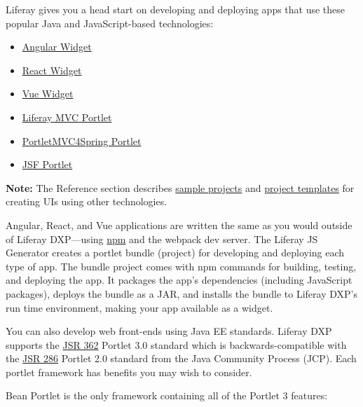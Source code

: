 Liferay gives you a head start on developing and deploying apps that use
these popular Java and JavaScript-based technologies:

\begin{itemize}
\tightlist
\item
  \href{/docs/7-2/appdev/-/knowledge_base/a/developing-an-angular-application}{Angular
  Widget}
\item
  \href{/docs/7-2/appdev/-/knowledge_base/a/developing-a-react-application}{React
  Widget}
\item
  \href{/docs/7-2/appdev/-/knowledge_base/a/developing-a-vue-application}{Vue
  Widget}
\item
  \href{/docs/7-2/appdev/-/knowledge_base/a/liferay-mvc-portlet}{Liferay
  MVC Portlet}
\item
  \href{/docs/7-2/appdev/-/knowledge_base/a/portletmvc4spring}{PortletMVC4Spring
  Portlet}
\item
  \href{/docs/7-2/appdev/-/knowledge_base/a/jsf-portlet}{JSF Portlet}
\end{itemize}

\noindent\hrulefill

\textbf{Note:} The Reference section describes
\href{/docs/7-2/reference/-/knowledge_base/r/sample-projects}{sample
projects} and
\href{/docs/7-2/reference/-/knowledge_base/r/project-templates}{project
templates} for creating UIs using other technologies.

\noindent\hrulefill

Angular, React, and Vue applications are written the same as you would
outside of Liferay DXP---using \href{https://www.npmjs.com/}{npm} and
the webpack dev server. The Liferay JS Generator creates a portlet
bundle (project) for developing and deploying each type of app. The
bundle project comes with npm commands for building, testing, and
deploying the app. It packages the app's dependencies (including
JavaScript packages), deploys the bundle as a JAR, and installs the
bundle to Liferay DXP's run time environment, making your app available
as a widget.

You can also develop web front-ends using Java EE standards. Liferay DXP
supports the \href{https://jcp.org/en/jsr/detail?id=362}{JSR 362}
Portlet 3.0 standard which is backwards-compatible with the
\href{http://jcp.org/en/jsr/detail?id=286}{JSR 286} Portlet 2.0 standard
from the Java Community Process (JCP). Each portlet framework has
benefits you may wish to consider.

Bean Portlet is the only framework containing all of the Portlet 3
features:

